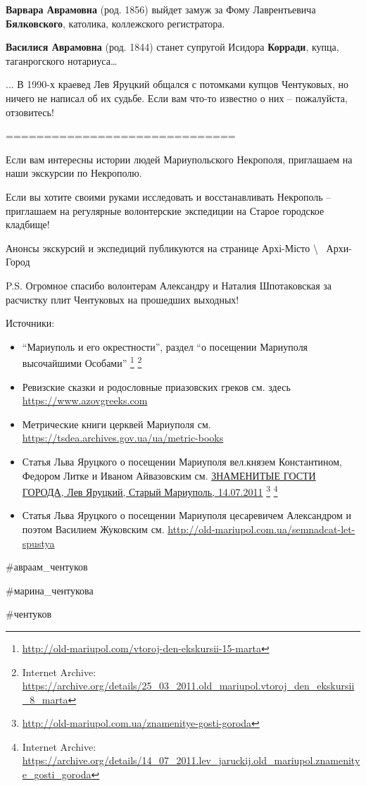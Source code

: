 \textbf{Варвара Аврамовна} (род. 1856) выйдет замуж за Фому Лаврентьевича \textbf{Бялковского},
католика, коллежского регистратора.

\textbf{Василися Аврамовна} (род. 1844) станет супругой Исидора
\textbf{Корради}, купца, таганрогского нотариуса…

... В 1990-х краевед Лев Яруцкий общался с потомками купцов Чентуковых, но ничего
не написал об их судьбе. Если вам что-то известно о них – пожалуйста,
отзовитесь!

==============================

Если вам интересны истории людей Мариупольского Некрополя, приглашаем на наши
экскурсии по Некрополю.

Если вы хотите своими руками исследовать и восстанавливать Некрополь –
приглашаем на регулярные волонтерские экспедиции на Старое городское кладбище!

Анонсы экскурсий и экспедиций публикуются на странице Архі-Місто
\textbackslash~ Архи-Город

P.S. Огромное спасибо волонтерам Александру и Наталия Шпотаковская за расчистку
плит Чентуковых на прошедших выходных!

Источники:

\begin{itemize} %
\item \enquote{Мариуполь и его окрестности}, раздел \enquote{о посещении Мариуполя высочайшими Особами}
				\footnote{\url{http://old-mariupol.com/vtoroj-den-ekskursii-15-marta}}
				\footnote{Internet Archive: \url{https://archive.org/details/25_03_2011.old_mariupol.vtoroj_den_ekskursii_8_marta}}
\item Ревизские сказки и родословные приазовских греков см. здесь \url{https://www.azovgreeks.com}
\item Метрические книги церквей Мариуполя см. \url{https://tsdea.archives.gov.ua/ua/metric-books}
\item Статья Льва Яруцкого о посещении Мариуполя вел.князем Константином, Федором Литке и Иваном Айвазовским см. 
\href{https://archive.org/details/14_07_2011.lev_jaruckij.old_mariupol.znamenitye_gosti_goroda}{%
				ЗНАМЕНИТЫЕ ГОСТИ ГОРОДА, Лев Яруцкий, Старый Мариуполь, 14.07.2011}
\footnote{\url{http://old-mariupol.com.ua/znamenitye-gosti-goroda}}
\footnote{Internet Archive: \url{https://archive.org/details/14_07_2011.lev_jaruckij.old_mariupol.znamenitye_gosti_goroda}}

\item Статья Льва Яруцкого о посещении Мариуполя цесаревичем Александром и поэтом Василием Жуковским см. 
\url{http://old-mariupol.com.ua/semnadcat-let-spustya}
\end{itemize} %

\#авраам\_чентуков

\#марина\_чентукова

\#чентуков
